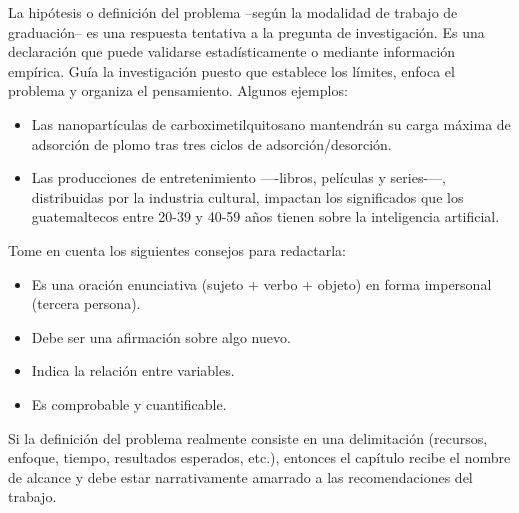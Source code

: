 La hipótesis o definición del problema --según la modalidad de trabajo de graduación-- es una respuesta tentativa a la pregunta de investigación. Es una declaración que puede validarse estadísticamente o mediante información empírica. Guía la investigación puesto que establece los límites, enfoca el problema y organiza el pensamiento. Algunos ejemplos: 

\begin{itemize}
    \item Las nanopartículas de carboximetilquitosano mantendrán su carga máxima de adsorción de plomo tras tres ciclos de adsorción/desorción.

    \item Las producciones de entretenimiento —-libros, películas y series-—, distribuidas por la industria cultural, impactan los significados que los guatemaltecos entre 20-39 y 40-59 años tienen sobre la inteligencia artificial.
    
\end{itemize}

\noindent
Tome en cuenta los siguientes consejos para redactarla:
\begin{itemize}
    \item Es una oración enunciativa (sujeto + verbo + objeto) en forma impersonal (tercera persona).

    \item Debe ser una afirmación sobre algo nuevo.

    \item Indica la relación entre variables.

    \item Es comprobable y cuantificable.
\end{itemize}

Si la definición del problema realmente consiste en una delimitación (recursos, enfoque, tiempo, resultados esperados, etc.), entonces el capítulo recibe el nombre de alcance y debe estar narrativamente amarrado a las recomendaciones del trabajo.
